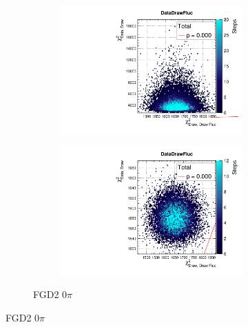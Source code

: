 \begin{figure}[h]
\begin{subfigure}[t]{\textwidth}
\begin{subfigure}[t]{0.24\textwidth}
\includegraphics[width=\textwidth, trim={0mm 0mm 0mm 8mm}, clip,page=38]{figures/mach3/data/priorpred/2017b_NewDet_3Xsec_4Det_5Flux_NewXSecTune_Data_merge_PriorPred_procs}
\end{subfigure}
	\begin{subfigure}[t]{0.24\textwidth}
		\includegraphics[width=\textwidth, trim={0mm 0mm 0mm 8mm}, clip,page=38]{figures/mach3/data/postpred/2017b_NewData_NewDet_UpdXsecStep_2Xsec_4Det_5Flux_0_PostPred_procs}
	\end{subfigure}
\caption{FGD2 0$\pi$}
\end{subfigure}
	

\end{figure}
